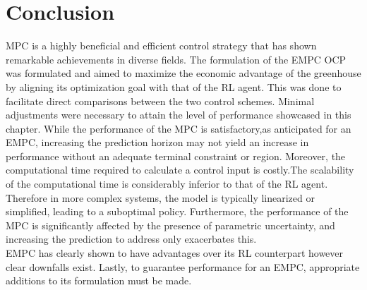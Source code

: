 \section{Conclusion}
MPC is a highly beneficial and efficient control strategy that has shown remarkable achievements in diverse fields. The formulation of the EMPC OCP was formulated and aimed to maximize the economic advantage of the greenhouse by aligning its optimization goal with that of the RL agent. This was done to facilitate direct comparisons between the two control schemes. Minimal adjustments were necessary to attain the level of performance showcased in this chapter. While the performance of the MPC is satisfactory,as anticipated for an EMPC, increasing the prediction horizon may not yield an increase in performance without an adequate terminal constraint or region. Moreover, the computational time required to calculate a control input is costly.The scalability of the computational time is considerably inferior to that of the RL agent. Therefore in more complex systems, the model is typically linearized or simplified, leading to a suboptimal policy. Furthermore, the performance of the MPC is significantly affected by the presence of parametric uncertainty, and increasing the prediction to address only exacerbates this. \\
EMPC has clearly shown to have advantages over its RL counterpart however clear downfalls exist. Lastly, to guarantee performance for an EMPC, appropriate additions to its formulation must be made. 